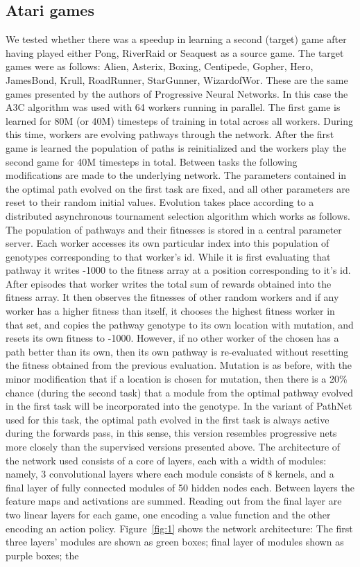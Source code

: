 \documentclass{sig-alternate-05-2015}
\begin{document}
\subsection{Atari games} 
 We tested whether there was a speedup in learning a second (target) game after having played either Pong, RiverRaid or Seaquest as a source game. The target games were as follows: Alien, Asterix, Boxing, Centipede, Gopher, Hero, JamesBond, Krull, RoadRunner, StarGunner, WizardofWor. These are the same games presented by the authors of Progressive Neural Networks. In this case the A3C algorithm was used with 64 workers running in parallel. The first game is learned for 80M (or 40M) timesteps of training in total across all workers. During this time, workers are evolving pathways through the network. After the first game is learned the population of paths is reinitialized and the workers play the second game for 40M timesteps in total. Between tasks the following modifications are made to the underlying network. The parameters contained in the optimal path evolved on the first task are fixed, and all other parameters are reset to their random initial values. Evolution takes place according to a distributed asynchronous tournament selection algorithm which works as follows. The population of pathways and their fitnesses is stored in a central parameter server. Each worker accesses its own particular index into this population of genotypes corresponding to that worker's id. While it is first evaluating that pathway it writes -1000 to the fitness array at a position corresponding to it's id. After  episodes that worker writes the total sum of rewards obtained into the fitness array. It then observes the fitnesses of  other random workers and if any worker has a higher fitness than itself, it chooses the highest fitness worker in that set, and copies the pathway genotype to its own location with mutation, and resets its own fitness to -1000. However, if no other worker of the  chosen has a path better than its own, then its own pathway is re-evaluated without resetting the fitness obtained from the previous evaluation. Mutation is as before, with the minor modification that if a location is chosen for mutation, then there is a 20\% chance (during the second task) that a module from the optimal pathway evolved in the first task will be incorporated into the genotype. In the variant of PathNet used for this task, the optimal path evolved in the first task is always active during the forwards pass, in this sense, this version resembles progressive nets more closely than the supervised versions presented above. The architecture of the network used consists of a core of  layers, each with a width of  modules: namely, 3 convolutional layers where each module consists of 8 kernels, and a final layer of fully connected modules of 50 hidden nodes each. Between layers the feature maps and activations are summed. Reading out from the final layer are two linear layers for each game, one encoding a value function and the other encoding an action policy. Figure~\ref{fig:1} shows the network architecture: The first three layers' modules are shown as \textcolor{fig2_green}{green boxes}; final layer of modules shown as \textcolor{fig2_purple}{purple boxes}; the 
\end{document}
